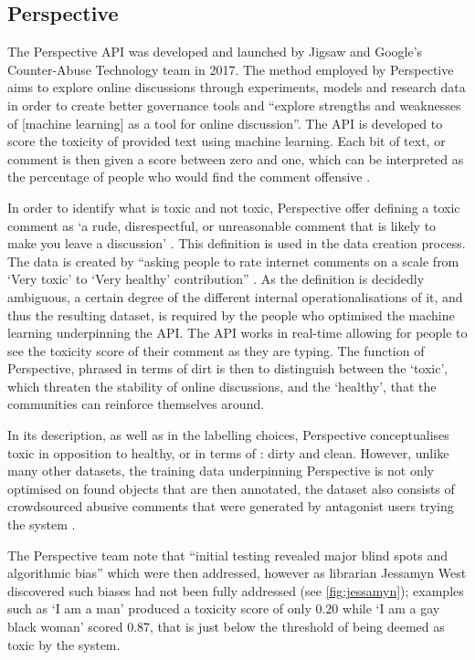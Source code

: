 \subsection{Perspective}\label{sub:perspective}

The Perspective API was developed \cite{Wulczyn:2017} and launched by Jigsaw and Google's Counter-Abuse Technology team in 2017. 
The method employed by Perspective aims to explore online discussions through experiments, models and research data in order to create better governance tools and ``explore strengths and weaknesses of [machine learning] as a tool for online discussion''. 
The API is developed to score the toxicity of provided text using machine learning. 
Each bit of text, or comment is then given a score between zero and one, which can be interpreted as the percentage of people who would find the comment offensive \cite{Perspective:Github}.

In order to identify what is toxic and not toxic, Perspective offer defining a toxic comment as ‘a rude, disrespectful, or unreasonable comment that is likely to make you leave a discussion' \cite{Perspective:Github}. 
This definition is used in the data creation process.
The data is created by ``asking people to rate internet comments on a scale from `Very toxic' to `Very healthy' contribution'' \cite{Dias:2021}.
As the definition is decidedly ambiguous, a certain degree of the different internal operationalisations of it, and thus the resulting dataset, is required by the people who optimised the machine learning underpinning the API.
The API works in real-time allowing for people to see the toxicity score of their comment as they are typing. 
The function of Perspective, phrased in terms of dirt is then to distinguish between the `toxic', which threaten the stability of online discussions, and the `healthy', that the communities can reinforce themselves around.
\vspace{5mm}

In its description, as well as in the labelling choices, Perspective conceptualises toxic in opposition to healthy, or in terms of \citet{Douglas:1966}: dirty and clean. 
However, unlike many other datasets, the training data underpinning Perspective is not only optimised on found objects that are then annotated, the dataset also consists of crowdsourced abusive comments that were generated by antagonist users trying the system \cite{Marvin:2019}.
\vspace{5mm}

The Perspective team note that ``initial testing revealed major blind spots and algorithmic bias'' \cite{Marvin:2019} which were then addressed, however as librarian Jessamyn West discovered such biases had not been fully addressed (see \autoref{fig:jessamyn}); examples such as `I am a man' produced a toxicity score of only $0.20$ while `I am a gay black woman' scored $0.87$, that is just below the threshold of being deemed as toxic by the system.

